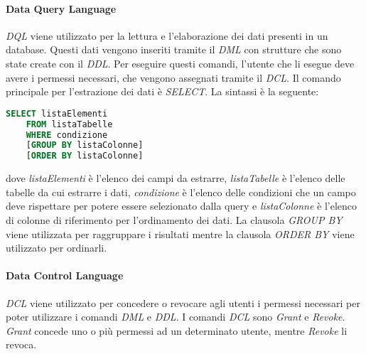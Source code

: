  \paragraph{Data Query Language}
  \textit{DQL} viene utilizzato per la lettura e l'elaborazione dei dati presenti in un database. Questi dati vengono inseriti
  tramite il \textit{DML} con strutture che sono state create con il \textit{DDL}. Per eseguire questi comandi, l'utente 
  che li esegue deve avere i permessi necessari, che vengono assegnati tramite il \textit{DCL}. Il comando principale
  per l'estrazione dei dati è \textit{SELECT}. La sintassi è la seguente:
  \begin{lstlisting}[language=sql]
    SELECT listaElementi
    FROM listaTabelle 
    WHERE condizione
    [GROUP BY listaColonne]
    [ORDER BY listaColonne]
  \end{lstlisting}
  dove \textit{listaElementi} è l'elenco dei campi da estrarre, \textit{listaTabelle} è l'elenco delle tabelle da cui
  estrarre i dati, \textit{condizione} è l'elenco delle condizioni che un campo deve rispettare per potere essere selezionato
  dalla query e \textit{listaColonne} è l'elenco di colonne di riferimento per l'ordinamento dei dati.
  La clausola \textit{GROUP BY} viene utilizzata per raggruppare i risultati mentre la clausola \textit{ORDER BY} viene 
  utilizzato per ordinarli.
  
  \paragraph{Data Control Language}
  \textit{DCL} viene utilizzato per concedere o revocare agli utenti i permessi necessari per poter utilizzare i comandi
  \textit{DML} e \textit{DDL}. I comandi \textit{DCL} sono \textit{Grant} e \textit{Revoke}. \textit{Grant} concede uno o più
  permessi ad un determinato utente, mentre \textit{Revoke} li revoca.
  

